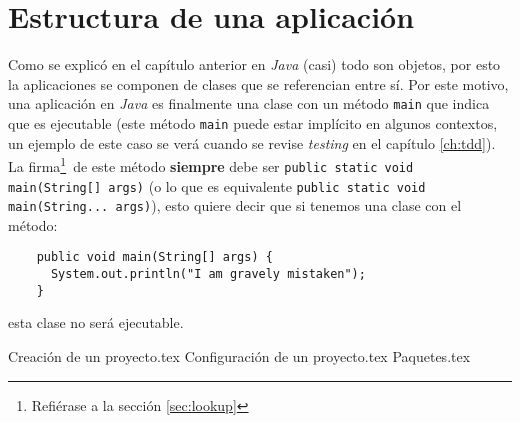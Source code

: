 \section{Estructura de una aplicación}
  Como se explicó en el capítulo anterior en \textit{Java} (casi) todo son objetos, por 
  esto la aplicaciones se componen de clases que se referencian entre sí.
  Por este motivo, una aplicación en \textit{Java} es finalmente una clase con un método
  \texttt{main} que indica que es ejecutable (este método \texttt{main} puede estar 
  implícito en algunos contextos, un ejemplo de este caso se verá cuando se revise 
  \textit{testing} en el capítulo \ref{ch:tdd}).
  La firma\footnote{Refiérase a la sección \ref{sec:lookup}}\ de este método 
  \textbf{siempre} debe ser \texttt{public static void main(String[] args)}
  (o lo que es equivalente \texttt{public static void main(String... args)}), 
  esto quiere decir que si tenemos una clase con el método:

  \begin{verbatim}
    public void main(String[] args) {
      System.out.println("I am gravely mistaken");
    }
  \end{verbatim}

  esta clase no será ejecutable.
  
  {Creación de un proyecto.tex}
  \newpage
  {Configuración de un proyecto.tex}
  {Paquetes.tex}
%